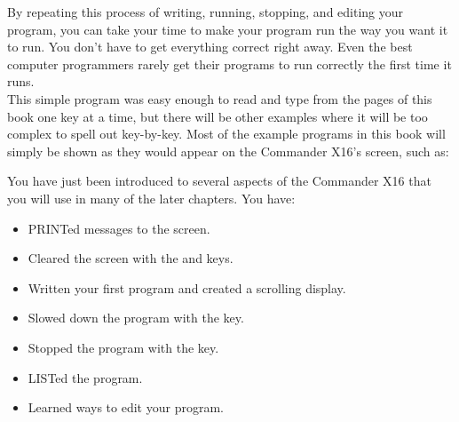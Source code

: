 By repeating this process of writing, running, stopping, and editing your
program, you can take your time to make your program run the way you want it to
run.  You don't have to get everything correct right away.  Even the best
computer programmers rarely get their programs to run correctly the first time
it runs.\\

This simple program was easy enough to read and type from the pages of this
book one key at a time, but there will be other examples where it will be too
complex to spell out key-by-key.  Most of the example programs in this book
will simply be shown as they would appear on the Commander X16's screen, such as:\\



You have just been introduced to several aspects of the Commander X16 that you
will use in many of the later chapters.  You have:

\begin{itemize}

	\item {\ttfamily PRINT}ed messages to the screen.

	\item Cleared the screen with the \shiftkey and \clrhomekey keys.
	
	\item Written your first program and created a scrolling display.
	
	\item Slowed down the program with the \ctrlkey key.

	\item Stopped the program with the \runstopkey key.

	\item {\ttfamily LIST}ed the program.

	\item Learned ways to edit your program.

\end{itemize}

